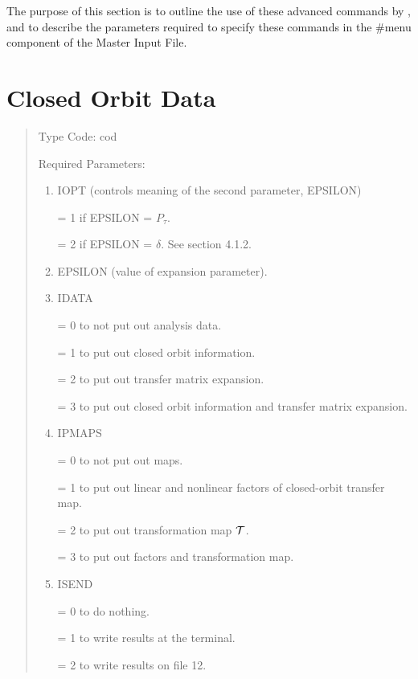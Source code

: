      The purpose of this section is to outline the use of these advanced
commands by \linebreak \Maryend, and to describe the parameters required to specify
these commands in the \#menu component of the Master Input File.

\newpage
\section{Closed Orbit Data}
\begin{quotation}
\noindent     Type Code:  cod  
\vspace{5mm}

\noindent Required Parameters:
\begin{enumerate}
      \item  IOPT (controls meaning of the second parameter, EPSILON)

             = 1 if EPSILON = $P_\tau$.

             = 2 if EPSILON = $\delta$.  See section 4.1.2.

      \item  EPSILON (value of expansion parameter).

      \item  IDATA

             = 0 to not put out analysis data.

             = 1 to put out closed orbit information.

             = 2 to put out transfer matrix expansion.

             = 3 to put out closed orbit information and transfer matrix
			 expansion.

      \item  IPMAPS

             = 0 to not put out maps.

             = 1 to put out linear and nonlinear factors of closed-orbit
               transfer map.

             = 2 to put out transformation map ${\cal T}$.

             = 3 to put out factors and transformation map.

      \item  ISEND

             = 0 to do nothing.

             = 1 to write results at the terminal.

             = 2 to write results on file 12.


\end{enumerate}
\end{quotation}
